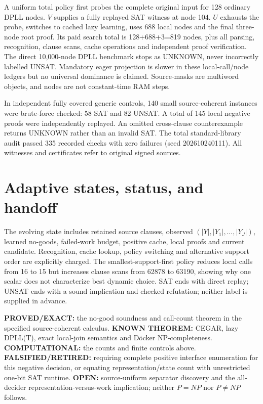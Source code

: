 \documentclass[11pt]{article}
\begin{document}
A uniform total policy first probes the complete original input for 128 ordinary DPLL nodes. $V$ supplies a fully replayed SAT witness at node 104. $U$ exhausts the probe, switches to cached lazy learning, uses 688 local nodes and the final three-node root proof. Its paid search total is 128+688+3=819 nodes, plus all parsing, recognition, clause scans, cache operations and independent proof verification. The direct 10,000-node DPLL benchmark stops as UNKNOWN, never incorrectly labelled UNSAT. Mandatory eager projection is slower in these local-call/node ledgers but no universal dominance is claimed. Source-masks are multiword objects, and nodes are not constant-time RAM steps.

In independent fully covered generic controls, 140 small source-coherent instances were brute-force checked: 58 SAT and 82 UNSAT. A total of 145 local negative proofs were independently replayed. An omitted cross-clause counterexample returns UNKNOWN rather than an invalid SAT. The total standard-library audit passed 335 recorded checks with zero failures (seed 202610240111). All witnesses and certificates refer to original signed sources.

\section{Adaptive states, status, and handoff}
The evolving state includes retained source clauses, observed $(|Y|,|Y_1|,\ldots,|Y_J|)$, learned no-goods, failed-work budget, positive cache, local proofs and current candidate. Recognition, cache lookup, policy switching and alternative support order are explicitly charged. The smallest-support-first policy reduces local calls from 16 to 15 but increases clause scans from 62878 to 63190, showing why one scalar does not characterize best dynamic choice. SAT ends with direct replay; UNSAT ends with a sound implication and checked refutation; neither label is supplied in advance.

\noindent\textbf{PROVED/EXACT:} the no-good soundness and call-count theorem in the specified source-coherent calculus. \textbf{KNOWN THEOREM:} CEGAR, lazy DPLL(T), exact local-join semantics and Döcker NP-completeness. \textbf{COMPUTATIONAL:} the counts and finite controls above. \textbf{FALSIFIED/RETIRED:} requiring complete positive interface enumeration for this negative decision, or equating representation/state count with unrestricted one-bit SAT runtime. \textbf{OPEN:} source-uniform separator discovery and the all-decider representation-versus-work implication; neither $P=NP$ nor $P\ne NP$ follows.
\end{document}
